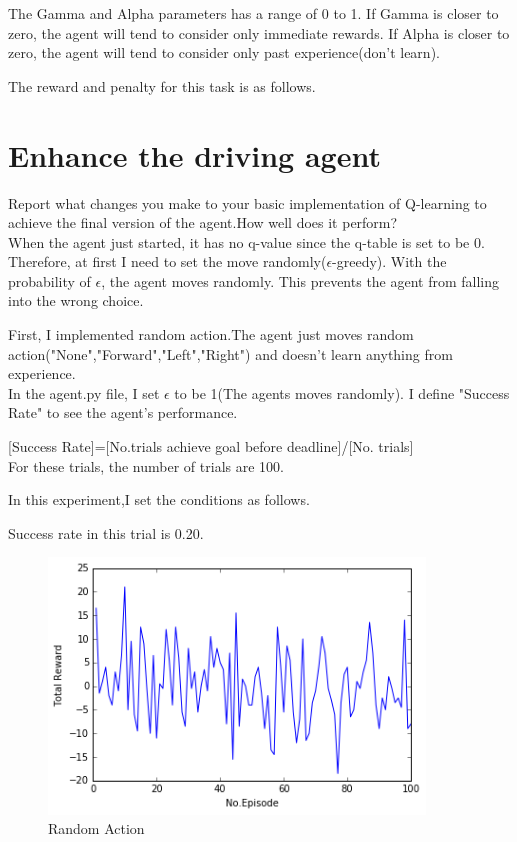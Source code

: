 \documentclass[a4paper,11pt]{article}
\begin{document}
The Gamma and Alpha parameters has a range of 0 to 1. If Gamma is closer to zero, the agent will tend to consider only immediate rewards. If Alpha is closer to zero, the agent will tend to consider only past experience(don't learn).

The reward and penalty for this task is as follows.

\section{Enhance the driving agent}

Report what changes you make to your basic implementation of Q-learning to achieve the final version of the agent.How well does it perform?
\\
When the agent just started, it has no q-value since the q-table is set to be 0. Therefore, at first I need to set the move randomly($\epsilon$-greedy).
With the probability of $\epsilon$, the agent moves randomly. This prevents the agent from falling into the wrong choice. 



First, I implemented random action.The agent just moves random action("None","Forward","Left","Right") and doesn't learn anything from experience.
\\
In the agent.py file, I set $\epsilon$ to be 1(The agents moves randomly).
I define "Success Rate" to see the agent's performance.

[Success Rate]=[No.trials achieve goal before deadline]/[No. trials]
\\For these trials, the number of trials are 100.

In this experiment,I set the conditions as follows.


Success rate in this trial is 0.20.


\begin{figure}[H]
\begin{center}
\includegraphics[width=100mm]{graph/random.jpg}
\end{center}
\caption{Random Action}
\label{fig:one}
\end{figure}
\end{document}
